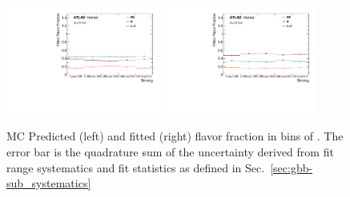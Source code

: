 \begin{figure}[htbp]
  \centering
 \includegraphics[width=0.45\textwidth]{figures/gbb/Sub_Sd0_Fits/Canv_dphi_FitFrac_Original.pdf}
 \includegraphics[width=0.45\textwidth]{figures/gbb/Sub_Sd0_Fits/Canv_dphi_FitFrac_Corrected.pdf}
\caption{MC Predicted (left) and fitted (right) flavor fraction in bins of \dphi. The error bar is the quadrature sum of the uncertainty derived from fit range systematics and fit statistics as defined in Sec.~\ref{sec:gbb-sub_systematics}}
  \label{fig:dphi-fitfrac}
\end{figure}


